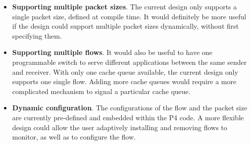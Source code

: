 \begin{itemize}[leftmargin=*, noitemsep]
	\item \textbf{Supporting multiple packet sizes}. The current design only supports a single packet size, defined at compile time. It would definitely be more useful if the design could support multiple packet sizes dynamically, without first specifying them.
	
	\item \textbf{Supporting multiple flows}. It would also be useful to have one programmable switch to serve different applications between the same sender and receiver. With only one cache queue available, the current design only supports one single flow. Adding more cache queues would require a more complicated mechanism to signal a particular cache queue. 
	
	\item \textbf{Dynamic configuration}. The configurations of the flow and the packet size are currently pre-defined and embedded within the P4 code. A more flexible design could allow the user adaptively installing and removing flows to monitor, as well as to configure the flow. 
\end{itemize}